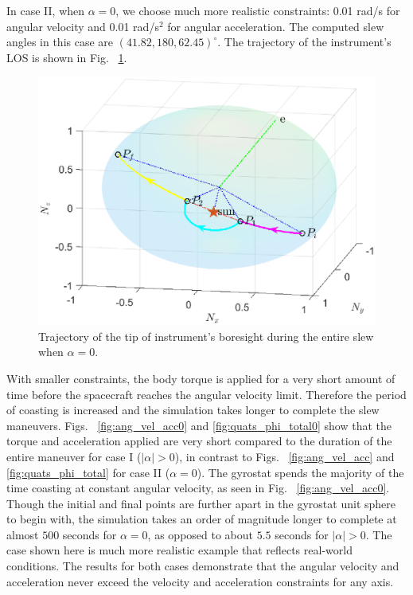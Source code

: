 \documentclass[journal ]{new-aiaa}
\begin{document}
In case II,  when $\alpha=0$, we choose much more realistic constraints: 0.01 rad/s for angular velocity and 0.01 rad/s$^2$ for angular acceleration. The computed slew angles in this case are $(41.82, 180, 62.45)^\circ$. The trajectory of the instrument's LOS is shown in Fig. ~\ref{fig:phi1_phi2_phi3_alpha0}.
\begin{figure}[!h]
\centering
		\includegraphics[width=4.75in]{figures/alpha0/alpha0_phi1_phi2_phi3.eps}		
\caption{Trajectory of the tip of instrument's boresight during the entire slew when $\alpha=0$.}
\label{fig:phi1_phi2_phi3_alpha0}
\end{figure}	
With smaller constraints, the body torque is applied for a very short amount of time before the spacecraft reaches the angular velocity limit. Therefore the period of coasting is increased and the simulation takes longer to complete the slew maneuvers. Figs. ~\ref{fig:ang_vel_acc0} and \ref{fig:quats_phi_total0} show that the torque and acceleration applied are very short compared to the duration of the entire maneuver for case I ($|\alpha| > 0$), in contrast to Figs. ~\ref{fig:ang_vel_acc} and \ref{fig:quats_phi_total} for case II ($\alpha = 0$). The gyrostat spends the majority of the time coasting at constant angular velocity, as seen in Fig. ~\ref{fig:ang_vel_acc0}. Though the initial and final points are further apart in the gyrostat unit sphere to begin with, the simulation takes an order of magnitude longer to complete at almost $500$ seconds for $\alpha = 0$, as opposed to about $5.5$ seconds for $|\alpha| > 0$. The case shown here is much more realistic example that reflects real-world conditions. The results for both cases demonstrate that the angular velocity and acceleration never exceed the velocity and acceleration constraints for any axis.
\end{document}
